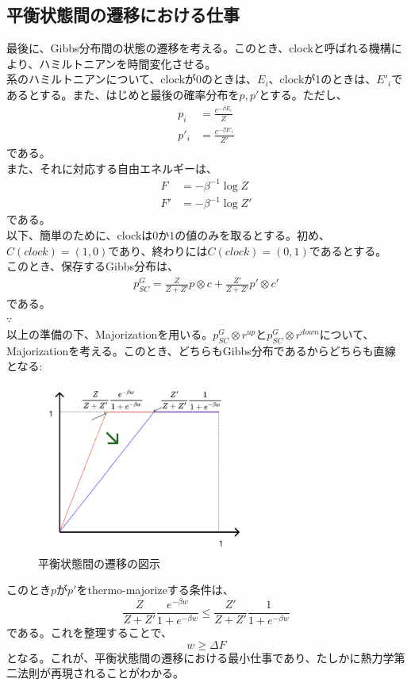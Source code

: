 \documentclass[a4paper,11pt]{jsarticle}
\numberwithin{equation}{section}
\begin{document}
\subsection{平衡状態間の遷移における仕事}
最後に、Gibbs分布間の状態の遷移を考える。このとき、clockと呼ばれる機構により、ハミルトニアンを時間変化させる。\\
系のハミルトニアンについて、clockが0のときは、$E_i$、clockが1のときは、$E'_i$であるとする。また、はじめと最後の確率分布を$p,p'$とする。ただし、
\begin{align}
    p_i &= \frac{e^{-\beta E_i}}{Z}\\
    p'_i &= \frac{e^{-\beta E'_i}}{Z'}
\end{align}
である。\\
また、それに対応する自由エネルギーは、
\begin{align}
    F &= -\beta^{-1}\log Z\\
    F' &= -\beta^{-1}\log Z'
\end{align}
である。\\
以下、簡単のために、clockは$0$か$1$の値のみを取るとする。初め、$C(clock)=(1,0)$であり、終わりには$C(clock)=(0,1)$であるとする。\\
このとき、保存するGibbs分布は、
\begin{align}
    p_{SC}^G = \frac{Z}{Z+Z'}p \otimes c + \frac{Z'}{Z+Z'}p' \otimes c'
\end{align}
である。\\
$\because$\\

以上の準備の下、Majorizationを用いる。$p_{SC}^G \otimes r^{up}$と$p_{SC}^G \otimes r^{down}$について、Majorizationを考える。このとき、どちらもGibbs分布であるからどちらも直線となる:

\begin{figure}[H]
    \begin{center}
    \includegraphics[width=70mm]{image7.png}
    \end{center}
    \caption{平衡状態間の遷移の図示}
    \label{fig:seven}
\end{figure}
このとき$p$が$p'$をthermo-majorizeする条件は、
\begin{equation}
    \frac{Z}{Z+Z'}\frac{e^{-\beta w}}{1+e^{-\beta w}} \leq \frac{Z'}{Z+Z'}\frac{1}{1+e^{-\beta w}}
\end{equation}
である。これを整理することで、
\begin{equation}
    w \geq \Delta F
\end{equation}
となる。これが、平衡状態間の遷移における最小仕事であり、たしかに熱力学第二法則が再現されることがわかる。\\
\end{document}
